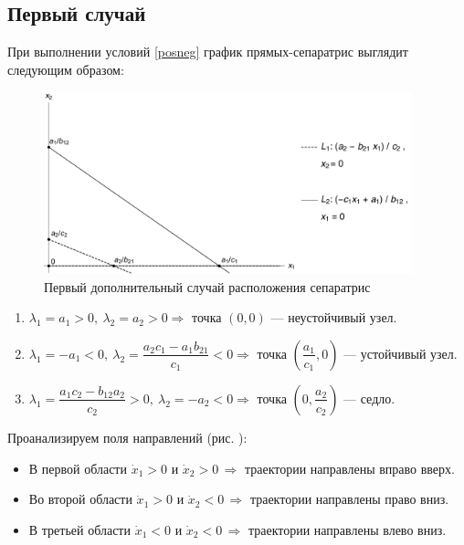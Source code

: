 \documentclass[12pt,a4paper]{article}
\begin{document}
    \subsection{Первый случай}
    При выполнении условий \eqref{posneg} график прямых-сепаратрис выглядит следующим образом:
    \begin{figure}[h]
        \centering
        \includegraphics[width=0.95\textwidth]{sep_3.pdf}
        \caption{Первый дополнительный случай расположения сепаратрис}
        \label{fig:sep_3}
    \end{figure}
    \begin{enumerate}
        \setlength\itemsep{0.5em}
        \item $ \lambda_1 = a_1 > 0,\ \lambda_2 = a_2 > 0 \Rightarrow $ точка $ (0, 0) $ --- неустойчивый узел.
    
        \item $ \lambda_1 = -a_1 < 0,\ \lambda_2 = \dfrac{a_2 c_1 - a_1 b_{21}}{c_1} < 0 \Rightarrow $ точка $ \left( \dfrac{a_1}{c_1}, 0 \right) $ --- устойчивый узел.
        
        \item  $ \lambda_1 = \dfrac{a_1 c_2 - b_{12} a_2}{c_2} > 0,\ \lambda_2 = -a_2 < 0 \Rightarrow $ точка $ \left( 0, \dfrac{a_2}{c_2} \right) $ --- седло.
        \\[0.05em]
    \end{enumerate}

    Проанализируем поля направлений (рис. ):

    \begin{itemize}
        \setlength\itemsep{0.4em}
        \item В первой области $ \dot x_1 > 0 $ и $ \dot x_2 > 0 \, \Rightarrow $ траектории направлены вправо вверх.
        \item Во второй области $ \dot x_1 > 0 $ и $ \dot x_2 < 0 \, \Rightarrow $ траектории направлены право вниз.
        \item В третьей области $ \dot x_1 < 0 $ и $ \dot x_2 < 0 \, \Rightarrow $ траектории направлены влево вниз.
    \end{itemize}
\end{document}
